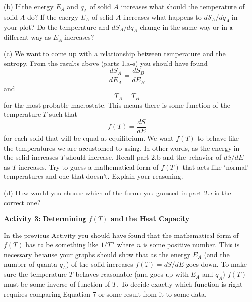 (b) If the energy $E_A$ and $q_A$ of solid $A$ increases what should the temperature 
of solid $A$ do?
If the energy $E_A$ of solid $A$ increases what happens to $dS_A/dq_A$ in your plot?
Do the temperature and $dS_A/dq_A$ change in the same  way or in a different way 
as $E_A$ increases?
\vspace{15mm}

(c) We want to come up with a relationship between temperature and the entropy.
From the results above (parts 1.a-e) you should have found
\begin{equation}
\frac{dS_A}{dE_A} = \frac{dS_B}{dE_B}
\end{equation}
and
\begin{equation}
T_A = T_B
\end{equation}
for the most probable macrostate.
This means there is some function of the temperature $T$ such that
\begin{equation}
f(T) = \frac{dS}{dE}
\end{equation}
for each solid that will be equal at equilibrium.
We want $f(T)$ to behave like the temperatures we are accustomed to using.
In other words, as the energy in the solid increases $T$ should increase.
Recall part 2.b and the behavior of $dS/dE$ as $T$ increases.
Try to guess a mathematical form of $f(T)$ that acts like `normal' temperatures
and one that doesn't. Explain your reasoning.
\vspace{30mm}

(d) How would you choose which of the forms you guessed in part 2.c is the correct one?
\vspace{15mm}

\textbf{Activity 3: Determining $f(T)$ and the Heat Capacity}

In the previous Activity you should have found that the mathematical form of $f(T)$
has to be something like $1/T^n$ where $n$ is some positive number.
This is necessary because your graphs should show that as the energy $E_A$ (and the number
of quanta $q_A$) of the solid 
increases $f(T)=dS/dE$ goes down. To make sure the temperature $T$ behaves reasonable
(and goes up with $E_A$ and $q_A$) $f(T)$ must be some inverse of function of $T$.
To decide exactly which function is right requires comparing Equation 7 or some
result from it to some data.

